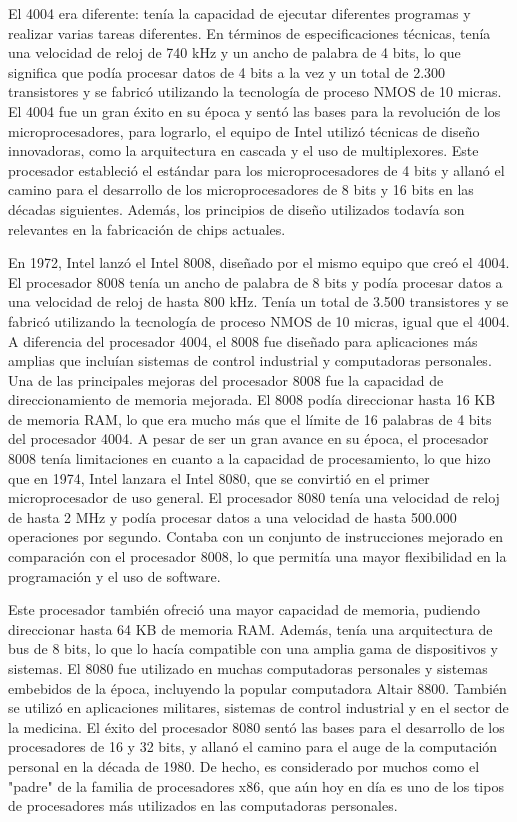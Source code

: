 \documentclass{article}
\begin{document}
El 4004 era diferente: tenía la capacidad de ejecutar diferentes programas y realizar varias tareas diferentes. 
En términos de especificaciones técnicas, tenía una velocidad de reloj de 740 kHz y un ancho de palabra de 4 bits, 
lo que significa que podía procesar datos de 4 bits a la vez y un total de 2.300 transistores y se fabricó utilizando 
la tecnología de proceso NMOS de 10 micras. El 4004 fue un gran éxito en su época y sentó las bases para la revolución 
de los microprocesadores, para lograrlo, el equipo de Intel utilizó técnicas de diseño innovadoras, como la arquitectura en cascada 
y el uso de multiplexores. Este procesador estableció el estándar para los microprocesadores de 4 bits y allanó el camino 
para el desarrollo  de los microprocesadores de 8 bits y 16 bits en las décadas siguientes. Además, los principios de diseño 
utilizados todavía son relevantes en la fabricación de chips actuales.

En 1972, Intel lanzó el Intel 8008, diseñado por el mismo equipo que creó el 4004. El procesador 8008 tenía un ancho de palabra de 8 bits 
y podía procesar datos a una velocidad de reloj de hasta 800 kHz. Tenía un total de 3.500 transistores y se fabricó utilizando 
la tecnología de proceso NMOS de 10 micras, igual que el 4004. A diferencia del procesador 4004, el 8008 fue diseñado para aplicaciones 
más amplias que incluían sistemas de control industrial y computadoras personales.
Una de las principales mejoras del procesador 8008 fue la capacidad de direccionamiento de memoria mejorada. El 8008 podía direccionar 
hasta 16 KB de memoria RAM, lo que era mucho más que el límite de 16 palabras de 4 bits del procesador 4004.
A pesar de ser un gran avance en su época, el procesador 8008 tenía limitaciones en cuanto a la capacidad de procesamiento, 
lo que hizo que en 1974, Intel lanzara el Intel 8080, que se convirtió en el primer microprocesador de uso general. 
El procesador 8080 tenía una velocidad de reloj de hasta 2 MHz y podía procesar datos a una velocidad de hasta 500.000 
operaciones por segundo. Contaba con un conjunto de instrucciones mejorado en comparación con el procesador 8008, lo que permitía 
una mayor flexibilidad en la programación y el uso de software.

Este procesador también ofreció una mayor capacidad de memoria, pudiendo direccionar hasta 64 KB de memoria RAM. Además, 
tenía una arquitectura de bus de 8 bits, lo que lo hacía compatible con una amplia gama de dispositivos y sistemas.
El 8080 fue utilizado en muchas computadoras personales y sistemas embebidos de la época, incluyendo la popular computadora Altair 8800. 
También se utilizó en aplicaciones militares, sistemas de control industrial y en el sector de la medicina. El éxito del procesador 8080 
sentó las bases para el desarrollo de los procesadores de 16 y 32 bits, y allanó el camino para el auge de la computación personal en la década de 1980. 
De hecho, es considerado por muchos como el "padre" de la familia de procesadores x86, que aún hoy en día es uno de los tipos de procesadores 
más utilizados en las computadoras personales.
\end{document}
